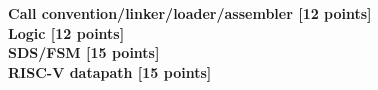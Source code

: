 \documentclass[addpoints, 12pt]{exam}
\begin{document}
\begin{questions}
\begin{parts}
\end{parts}

\question[12] \textbf{Call convention/linker/loader/assembler [12 points]}\\


\question[12] \textbf{Logic [12 points]}\\


\question[15] \textbf{SDS/FSM [15 points]}\\


\question[15] \textbf{RISC-V datapath [15 points]}\\


\end{questions}
\end{document}
